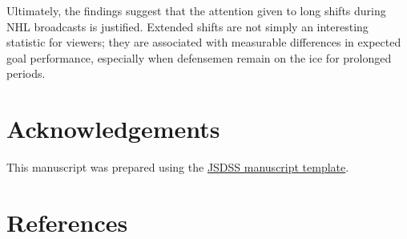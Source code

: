\documentclass[
  12pt]{article}
\begin{document}
Ultimately, the findings suggest that the attention given to long shifts
during NHL broadcasts is justified. Extended shifts are not simply an
interesting statistic for viewers; they are associated with measurable
differences in expected goal performance, especially when defensemen
remain on the ice for prolonged periods.

\section*{Acknowledgements}\label{acknowledgements}

This manuscript was prepared using the
\href{https://github.com/jsds-sports/jsdss-manuscript-template}{JSDSS
manuscript template}.

\section*{References}\label{references}

\renewcommand{\bibsection}{}

\end{document}
